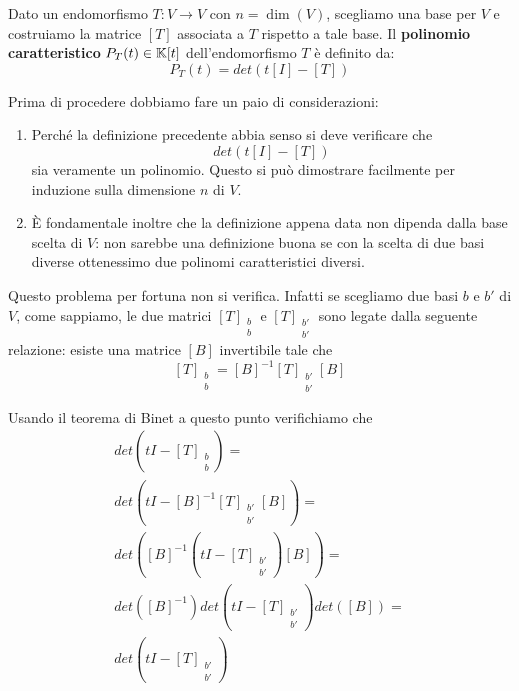 \begin{definition}
	Dato un endomorfismo $T : V \to V$ con $n = \dim(V)$, scegliamo una base
	per $V$ e costruiamo la matrice $[T]$ associata a $T$ rispetto a tale
	base. Il \textbf{polinomio caratteristico} $P_T(t) \in \mathbb{K}[t]$
	dell'endomorfismo $T$ è definito da:
	\[
		P_T(t) = det(t[I] - [T])
	\]
\end{definition}

\begin{observation}
	Prima di procedere dobbiamo fare un paio di considerazioni:
	\begin{enumerate}
		\item Perché la definizione precedente abbia senso si deve verificare
		      che \[det(t[I] - [T])\] sia veramente un polinomio. Questo si può
		      dimostrare facilmente per induzione sulla dimensione
		      $n$ di $V$.
		\item È fondamentale inoltre che la definizione appena data non dipenda
		      dalla base scelta di $V$: non sarebbe una definizione buona se con
		      la scelta di due basi diverse ottenessimo due polinomi
		      caratteristici diversi.
	\end{enumerate}
\end{observation}

Questo problema per fortuna non si verifica. Infatti se scegliamo due basi $b$ e
$b'$ di $V$, come sappiamo, le due matrici $[T]_{\substack{b \\ b}}$ e
$[T]_{\substack{b' \\ b'}}$ sono legate dalla seguente relazione: esiste una
matrice $[B]$ invertibile tale che
\[
	[T]_{\substack{b \\ b}} =
		[B]^{-1} [T]_{\substack{b' \\ b'}} [B]
\]

Usando il teorema di Binet a questo punto verifichiamo che
\begin{gather*}
	det \left(tI - [T]_{\substack{b \\ b}}\right) = \\
	det \left(tI - [B]^{-1} [T]_{\substack{b' \\ b'}} [B]\right) = \\
	det \left([B]^{-1} \left(tI - [T]_{\substack{b' \\ b'}}\right) [B] \right) = \\
	det \left([B]^{-1}\right) det \left(tI - [T]_{\substack{b' \\ b'}}\right)
	det \left([B]\right) = \\
	det \left(tI - [T]_{\substack{b' \\ b'}}\right)
\end{gather*}

